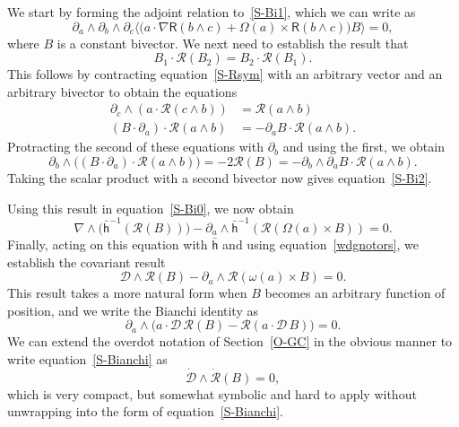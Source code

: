 \documentclass[a4paper]{article}
\numberwithin{equation}{section}
\newcommand{\dt}{\! \cdot \!}
\newcommand{\wdg}{\! \wedge \!}
\newcommand{\crs}{\! \times \!}
\newcommand{\la}{\langle}
\newcommand{\ra}{\rangle}
\newcommand{\om}{\omega}
\newcommand{\Om}{\Omega}
\newcommand{\cld}{{\mathcal{D}}}
\newcommand{\clr}{{\mathcal{R}}}
\newcommand{\da}{\partial_a}
\newcommand{\db}{\partial_b}
\newcommand{\dc}{\partial_c}
\newcommand{\lbh}{\bar{\mathsf{h}}}
\newcommand{\liR}{\mathsf{R}}
\newcommand{\ho}{\lbh}
\newcommand{\grad}{\nabla}
\newcommand{\cldd}{\dot{\cld}}
\begin{document}
We start by forming the adjoint relation to~\eqref{S-Bi1}, which we
can write as
%
\begin{equation}
\da \wdg \db \wdg \dc \la \bigl( a \dt \grad \liR(b\wdg c) + \Om(a)
\crs \liR(b \wdg c) \bigr) B \ra = 0,
\label{S-Bi0}
\end{equation}
%
where $B$ is a constant bivector.  We next need to establish the
result that
%
\begin{equation}
B_1 \dt \clr(B_2) = B_2 \dt \clr (B_1).
\label{S-Bi2}
\end{equation}
%
This follows by contracting equation~\eqref{S-Rsym} with an
arbitrary vector and an arbitrary bivector to obtain the equations
%
\begin{align}
\dc \wdg ( a \dt \clr(c \wdg b)) &= \clr (a \wdg b) \\
(B \dt \da) \dt \clr(a \wdg b) &= - \da B \dt \clr(a \wdg b).
\end{align}
%
Protracting the second of these equations with $\db$ and using the
first, we obtain
%
\begin{equation}
\db \wdg \bigl( (B\dt\da) \dt \clr( a \wdg b) \bigr) = -2 \clr(B) = 
- \db \wdg \da B \dt \clr(a \wdg b).
\end{equation}
%
Taking the scalar product with a second bivector now gives
equation~\eqref{S-Bi2}.


Using this result in equation~\eqref{S-Bi0}, we now obtain
%
\begin{equation}
\grad \wdg \bigl( \ho^{-1}(\clr(B)) \bigr) - \da \wdg
\ho^{-1}(\clr(\Om(a) \crs B)) =0. 
\end{equation}
%
Finally, acting on this equation with $\ho$ and using
equation~\eqref{wdgnotors}, we establish the covariant result
%
\begin{equation}
\cld \wdg \clr(B) - \da \wdg \clr(\om(a) \crs B) = 0.
\end{equation}
%
This result takes a more natural form when $B$ becomes an arbitrary
function of position, and we write the Bianchi identity as
%
\begin{equation}
\da \wdg \bigl( a \dt \cld \, \clr(B) - \clr(a \dt\cld \, B) \bigr) = 0.
\label{S-Bianchi}
\end{equation}
%
We can extend the overdot notation of Section~\eqref{O-GC} in the obvious
manner to write equation~\eqref{S-Bianchi} as
%
\begin{equation}
\cldd \wdg \dot{\clr} (B) = 0,
\end{equation}
%
which is very compact, but somewhat symbolic and hard to apply without
unwrapping into the form of equation~\eqref{S-Bianchi}.
\end{document}
